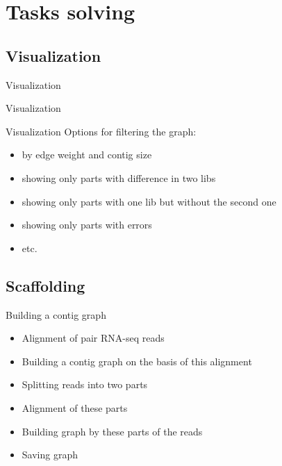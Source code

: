 \documentclass{beamer}
\newcommand{\cimg}[2]{%
	\begin{center}%
		\ifthenelse{\equal{#2}{}}{%
			\texttt{[image: \#1]}
		}{%
			\texttt{[image: \#1]}
		}%
	\end{center}%
}
\begin{document}
\section{Tasks solving}
\subsection{Visualization}

\begin{frame}[t]{Visualization}
\cimg{examp.jpg}{0.8}
\end{frame}

\begin{frame}[t]{Visualization}
	\cimg{diflib.png}{1.03}
\end{frame}


\begin{frame}[t]{Visualization}
Options for filtering the graph:
\begin{itemize}
	\item by edge weight and contig size
	\item showing only parts with difference in two libs 
	\item showing only parts with one lib but without the second one
	\item showing only parts with errors
	\item etc.
\end{itemize}
\end{frame}

\subsection{Scaffolding}

\begin{frame}[t]{Building a contig graph}
	\begin{itemize}
		\item Alignment of pair RNA-seq reads
		\item Building a contig graph on the basis of this alignment
		\item Splitting reads into two parts
		\item Alignment of these parts
		\item Building graph by these parts of the reads
		\item Saving graph
	\end{itemize}	
	\cimg{rnaReadsCon.png}{1}
\end{frame}
\end{document}
